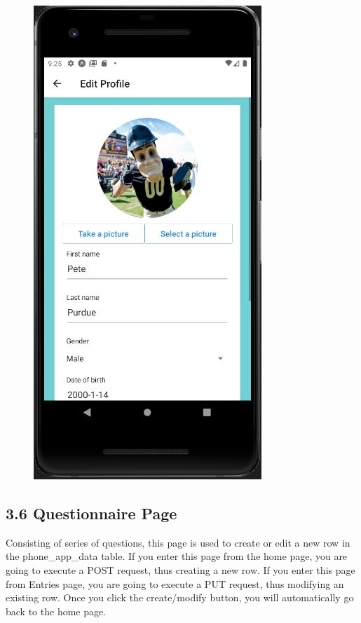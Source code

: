 \documentclass[]{book}
\begin{document}
\begin{figure}
\centering
\includegraphics{./phone_app_doc_images/edit_profile_page.JPG}
\caption{}
\end{figure}

\subsection{3.6 Questionnaire Page}\label{questionnaire-page}

Consisting of series of questions, this page is used to create or edit a
new row in the phone\_app\_data table. If you enter this page from the
home page, you are going to execute a POST request, thus creating a new
row. If you enter this page from Entries page, you are going to execute
a PUT request, thus modifying an existing row. Once you click the
create/modify button, you will automatically go back to the home page.
\end{document}

